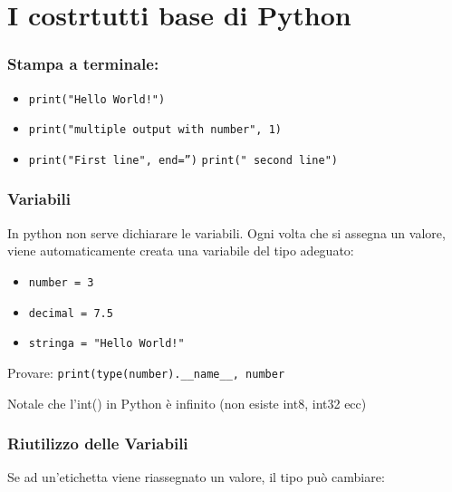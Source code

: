 \documentclass{beamer}
\begin{document}
{\begin{frame}
\end{frame}


\section{I costrtutti base di Python}

\begin{frame}
    
    \frametitle{Stampa a terminale:}

    \begin{itemize}
        \item  \texttt{print("Hello World!")}
    
        \item \texttt{print("multiple output with number", 1)}
    
        \item \texttt{print("First line", end='')}
                \texttt{print(" second line")}
    \end{itemize}


\end{frame}

\begin{frame}
    
    \frametitle{Variabili}
    In python non serve dichiarare le variabili.
    Ogni volta che si assegna un valore, viene automaticamente creata una variabile del tipo adeguato:

    \begin{itemize}
        \item  \texttt{number = 3}
    
        \item \texttt{decimal = 7.5}
    
        \item \texttt{stringa = "Hello World!"}
    \end{itemize}

    Provare:
    \texttt{print(type(number).__name__, number}

    Notale che l'int() in Python è infinito (non esiste int8, int32 ecc)

\end{frame}

\begin{frame}
    
    \frametitle{Riutilizzo delle Variabili}
    Se ad un'etichetta viene riassegnato un valore, il tipo può cambiare:


\end{frame}}
\end{document}
